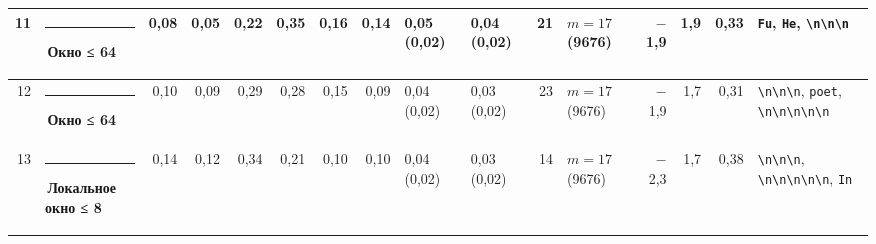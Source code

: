 \documentclass[10pt]{article}
\begin{document}
\begin{minipage}{\linewidth}
\begin{center}
{\begin{tabular}{|r|l|r|r|r|r|r|r|l|l|r|l|r|r|r|l|}
11 & \textcolor[HTML]{EDA100}{\rule{0.62em}{0.62em}}\,\textbf{Окно ≤ 64} & 0,08 & 0,05 & 0,22 & 0,35 & 0,16 & 0,14 & 0,05 (0,02) & 0,04 (0,02) & 21 & $m{=}17$ (9676) & $-$1,9 & 1,9 & 0,33 & \texttt{\textvisiblespace{}Fu}, \texttt{\textvisiblespace{}He}, \texttt{\textvisiblespace{}\textbackslash{}n\textbackslash{}n\textbackslash{}n} \\ \hline
12 & \textcolor[HTML]{EDA100}{\rule{0.62em}{0.62em}}\,\textbf{Окно ≤ 64} & 0,10 & 0,09 & 0,29 & 0,28 & 0,15 & 0,09 & 0,04 (0,02) & 0,03 (0,02) & 23 & $m{=}17$ (9676) & $-$1,9 & 1,7 & 0,31 & \texttt{\textvisiblespace{}\textbackslash{}n\textbackslash{}n\textbackslash{}n}, \texttt{\textvisiblespace{}poet}, \texttt{\textbackslash{}n\textbackslash{}n\textbackslash{}n\textbackslash{}n\textbackslash{}n} \\ \hline
13 & \textcolor[HTML]{1BAF7A}{\rule{0.62em}{0.62em}}\,\textbf{Локальное окно ≤ 8} & 0,14 & 0,12 & 0,34 & 0,21 & 0,10 & 0,10 & 0,04 (0,02) & 0,03 (0,02) & 14 & $m{=}17$ (9676) & $-$2,3 & 1,7 & 0,38 & \texttt{\textvisiblespace{}\textbackslash{}n\textbackslash{}n\textbackslash{}n}, \texttt{\textbackslash{}n\textbackslash{}n\textbackslash{}n\textbackslash{}n\textbackslash{}n}, \texttt{\textvisiblespace{}In} \\ \hline
\hline\end{tabular}}\end{center}
\end{minipage}
\par\vspace{0.4em}
\end{document}
